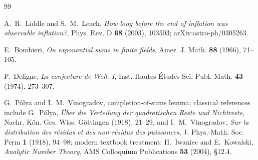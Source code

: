 \begin{thebibliography}{99}

A.~R.~Liddle and S.~M.~Leach,
\newblock \emph{How long before the end of inflation was observable inflation?},
\newblock Phys. Rev. D \textbf{68} (2003), 103503; arXiv:astro-ph/0305263.

E.~Bombieri,
\newblock \emph{On exponential sums in finite fields},
\newblock Amer. J. Math. \textbf{88} (1966), 71--105.

P.~Deligne,
\newblock \emph{La conjecture de Weil. I},
\newblock Inst. Hautes \'Etudes Sci. Publ. Math. \textbf{43} (1974), 273--307.

G.~P\'olya and I.~M.~Vinogradov,
\newblock completion-of-sums lemma; classical references include
G.~P\'olya, \emph{\"Uber die Verteilung der quadratischen Reste und Nichtreste},
Nachr. K\"on. Ges. Wiss. G\"ottingen (1918), 21--29, and
I.~M.~Vinogradov, \emph{Sur la distribution des r\'esidus et des non-r\'esidus des puissances},
J. Phys.-Math. Soc. Perm \textbf{1} (1918), 94--98; modern textbook treatment:
H.~Iwaniec and E.~Kowalski, \emph{Analytic Number Theory},
AMS Colloquium Publications \textbf{53} (2004), \S 12.4.

\end{thebibliography}
